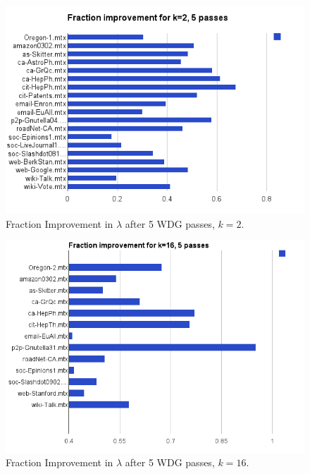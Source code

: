 \documentclass[11pt]{article}
\begin{document}
\begin{figure}[h!]
\centering
\includegraphics[scale=0.70] {figures/2partfrac}
\caption[Caption for]{Fraction Improvement in $\lambda$ after 5 WDG passes, $k=2$.}
\label{fig:03}
\end{figure}

\begin{figure}[h!]
\centering
\includegraphics[scale=0.65] {figures/16partfrac}
\caption[Caption for]{Fraction Improvement in $\lambda$ after 5 WDG passes, $k=16$.}
\label{fig:04}
\end{figure}
\end{document}
